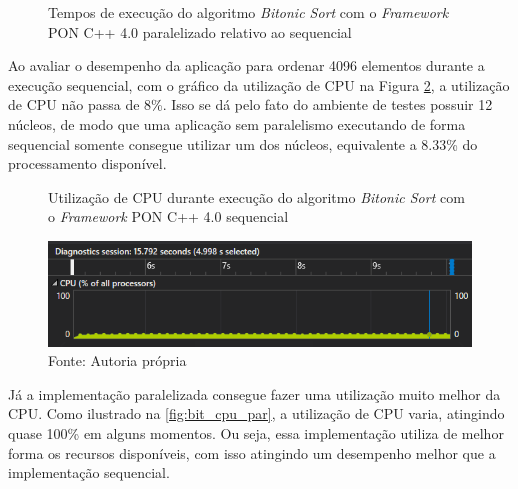 \begin{figure}[!htb]
  \centering
  \caption{Tempos de execução do algoritmo \textit{Bitonic Sort} com o \textit{Framework} PON C++ 4.0 paralelizado relativo ao sequencial}
  \label{fig:bitonic_bench_rel}
  \end{figure}

Ao avaliar o desempenho da aplicação para ordenar 4096 elementos durante a
execução sequencial, com o gráfico da utilização de CPU na Figura
\ref{fig:bit_cpu}, a utilização de CPU não passa de 8\%. Isso se dá pelo fato do
ambiente de testes possuir 12 núcleos, de modo que uma aplicação sem paralelismo
executando de forma sequencial somente consegue utilizar um dos núcleos,
equivalente a 8.33\% do processamento disponível.

\begin{figure}[!htb]
\centering
\caption{Utilização de CPU durante execução do algoritmo \textit{Bitonic Sort}
com o \textit{Framework} PON C++ 4.0 sequencial}
\includegraphics[width=\textwidth]{../figures/cpu_bitonic.png}
\smallskip
\caption*{Fonte: Autoria própria}
\label{fig:bit_cpu}
\end{figure}

Já a implementação paralelizada consegue fazer uma utilização muito melhor da
CPU. Como ilustrado na \ref{fig:bit_cpu_par}, a utilização de CPU varia,
atingindo quase 100\% em alguns momentos. Ou seja, essa implementação utiliza de
melhor forma os recursos disponíveis, com isso atingindo um desempenho melhor
que a implementação sequencial.

